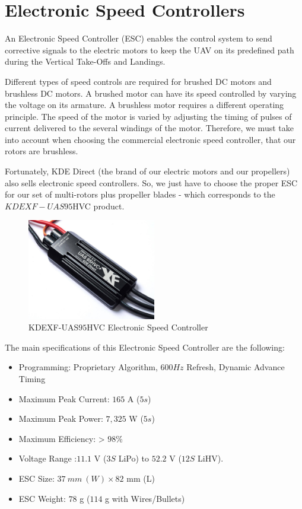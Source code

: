 \documentclass[english,fira]{ist-report}
\begin{document}
\section{Electronic Speed Controllers}
An Electronic Speed Controller (ESC) enables the control system to send corrective signals to the electric motors to keep the UAV on its predefined path during the Vertical Take-Offs and Landings. \par
Different types of speed controls are required for brushed DC motors and brushless DC motors. A brushed motor can have its speed controlled by varying the voltage on its armature. A brushless motor requires a different operating principle. The speed of the motor is varied by adjusting the timing of pulses of current delivered to the several windings of the motor. Therefore, we must take into account when choosing the commercial electronic speed controller, that our rotors are brushless. \par
Fortunately, KDE Direct (the brand of our electric motors and our propellers) also sells electronic speed controllers. So, we just have to choose the proper ESC for our set of multi-rotors plus propeller blades - which corresponds to the $KDEXF-UAS95$HVC product. \par
\begin{figure}[ht]
    \centering
    \includegraphics[width=0.5\textwidth]{graphics/AVIONICS/b.jpg}
    \caption{KDEXF-UAS$95$HVC Electronic Speed Controller}
    \label{fig:kdespeedcontroler}
\end{figure}

The main specifications of this Electronic Speed Controller are the following:
\begin{itemize}
    \item Programming: Proprietary Algorithm, $600Hz$ Refresh, Dynamic Advance Timing
    \item Maximum Peak Current: $165$ A ($5s$)
    \item Maximum Peak Power: $7,325$ W ($5s$)
    \item Maximum Efficiency:	> $98\%$
    \item Voltage Range	:$11.1$ V ($3S$ LiPo) to $52.2$ V ($12S$ LiHV).
    \item ESC Size: $37\ mm\ (W) \times 82$ mm (L)
    \item ESC Weight: $78$ g ($114$ g with Wires/Bullets)
\end{itemize}
\end{document}
